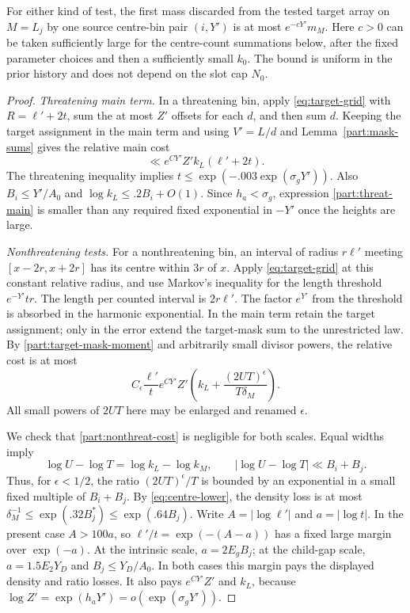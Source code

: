 \begin{lemma}
\label{part:history-test-cost}
For either kind of test, the first mass discarded from the tested
target array on $M=L_j$ by one source centre-bin pair $(i,Y')$ is at
most $e^{-cY'}m_M$.  Here $c>0$ can be taken sufficiently large for
the centre-count summations below, after the fixed parameter choices
and then a sufficiently small $k_0$.  The bound is uniform in the
prior history and does not depend on the slot cap $N_0$.
\end{lemma}

\begin{proof}
\emph{Threatening main term.}\quad
In a threatening bin, apply \eqref{eq:target-grid} with
$R=\ell'+2t$, sum the at most $Z'$ offsets for each $d$, and then
sum $d$.  Keeping the target assignment in the main term and using
$V'=L/d$ and Lemma~\ref{part:mask-sums} gives the relative main cost
\begin{equation}
 \ll e^{CY'}Z'k_L(\ell'+2t).
\label{part:threat-main}
\end{equation}
The threatening inequality implies
$t\le\exp(-.003\exp(\sigma_gY'))$.  Also
$B_i\le Y'/A_0$ and $\log k_L\le .2B_i+O(1)$.
Since $h_a<\sigma_g$, expression
\eqref{part:threat-main} is smaller than any required fixed
exponential in $-Y'$ once the heights are large.

\emph{Nonthreatening tests.}\quad
For a nonthreatening bin, an interval of radius $r\ell'$ meeting
$[x-2r,x+2r]$ has its centre within $3r$ of $x$.
Apply \eqref{eq:target-grid} at this constant relative radius, and
use Markov's inequality for the length threshold $e^{-Y'}tr$.
The length per counted interval is $2r\ell'$.  The factor $e^{Y'}$
from the threshold is absorbed in the harmonic exponential.  In the
main term retain the target assignment; only in the error extend
the target-mask sum to the unrestricted law.  By
\eqref{part:target-mask-moment} and arbitrarily small divisor powers,
the relative cost is at most
\begin{equation}
 C_\epsilon\frac{\ell'}{t}e^{CY'}Z'
 \left(k_L+\frac{(2UT)^\epsilon}{T\delta_M}\right).
\label{part:nonthreat-cost}
\end{equation}
All small powers of $2UT$ here may be enlarged and renamed
$\epsilon$.

We check that \eqref{part:nonthreat-cost} is negligible for both
scales.  Equal widths imply
\begin{equation}
 \log U-\log T=\log k_L-\log k_M,
 \qquad |\log U-\log T|\ll B_i+B_j.
\label{part:equal-width-ratios}
\end{equation}
Thus, for $\epsilon<1/2$, the ratio
$(2UT)^\epsilon/T$ is bounded by an exponential in a small fixed
multiple of $B_i+B_j$.  By \eqref{eq:centre-lower}, the density loss is at most
$\delta_M^{-1}\le \exp(.32B_j^*)\le\exp(.64B_j)$.
Write $A=|\log\ell'|$ and $a=|\log t|$.  In the present case
$A>100a$, so $\ell'/t=\exp(-(A-a))$ has a fixed large margin over
$\exp(-a)$.  At the intrinsic scale, $a=2E_gB_j$; at the
child-gap scale, $a=1.5E_2Y_D$ and $B_j\le Y_D/A_0$.
In both cases this margin pays the displayed density and ratio
losses.  It also pays $e^{CY'}Z'$ and $k_L$, because
$\log Z'=\exp(h_aY')=o(\exp(\sigma_gY'))$.


\end{proof}
